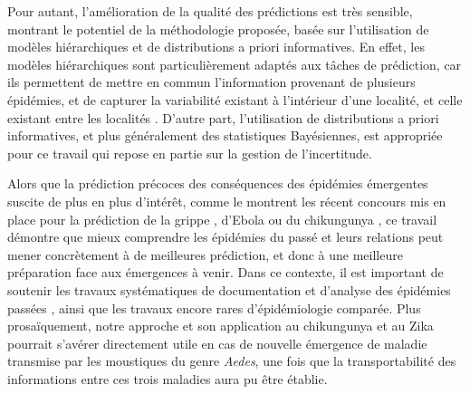 Pour autant, l'amélioration de la qualité des prédictions est très sensible, montrant le potentiel de la méthodologie proposée, basée sur l'utilisation de modèles hiérarchiques et de distributions a priori informatives.
En effet, les modèles hiérarchiques sont particulièrement adaptés aux tâches de prédiction, car ils permettent de mettre en commun l'information provenant de plusieurs épidémies, et de capturer la variabilité existant à l'intérieur d'une localité, et celle existant entre les localités \cite{gelman2006multilevel}.
D'autre part, l'utilisation de distributions a priori informatives, et plus généralement des statistiques Bayésiennes, est appropriée pour ce travail qui repose en partie sur la gestion de l'incertitude. 

Alors que la prédiction précoces des conséquences des épidémies émergentes suscite de plus en plus d'intérêt, comme le montrent les récent concours mis en place pour la prédiction de la grippe \cite{flu2017}, d'Ebola \cite{viboud2017rapidd} ou du chikungunya \cite{darpa2014}, ce travail démontre que mieux comprendre les épidémies du passé et leurs relations peut mener concrètement à de meilleures prédiction, et donc à une meilleure préparation face aux émergences à venir.
Dans ce contexte, il est important de soutenir les travaux systématiques de documentation et d'analyse des épidémies passées \cite{tycho_nejm_2013}, ainsi que les travaux encore rares d'épidémiologie comparée.
Plus prosaïquement, notre approche et son application au chikungunya et au Zika pourrait s'avérer directement utile en cas de nouvelle émergence de maladie transmise par les moustiques du genre {\em Aedes}, une fois que la transportabilité des informations entre ces trois maladies aura pu être établie.